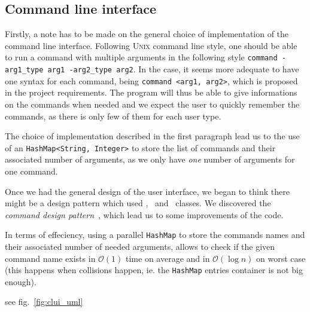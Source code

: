 
\subsection{Command line interface} %
\label{sub:command_line_interface}

Firstly, a note has to be made on the general choice of implementation
of the command line interface.
Following \textsc{Unix} command line style, one should be able to run
a command with multiple arguments in the following
style \lstinline|command -arg1_type arg1 -arg2_type arg2|.
In the \MyFoodora case, it seems more adequate to have one syntax for each
command, being \lstinline|command <arg1, arg2>|, which is proposed in 
the project requirements. The program will thus be able to give informations
on the commands when needed and we expect the user to quickly remember 
the commands, as there is only few of them for each user type.
 
The choice of implementation described in the first paragraph
lead us to the use of an \lstinline|HashMap<String, Integer>| to
store the list of commands and their associated number of arguments,
as we only have \emph{one} number of arguments for one command.

Once we had the general design of the user interface, we began to
think there might be a design pattern which used \Command, \CommandLine~and
\CommandProcessor~classes.
We discovered the \emph{command design pattern}~\cite{wiki:commandPattern},
which lead us to some improvements of the code.

In terms of effeciency, using a parallel \lstinline|HashMap| to store
the commands names and their associated number of needed arguments,
allows to check if the given command name exists in $\mathcal{O}(1)$
time on average and in $\mathcal{O}(\log{n})$ on worst case
(this happens when collisions happen, ie. the \lstinline|HashMap|
entries container is not big enough)\cite{hashMap}.

see fig.~\ref{fig:clui_uml}

